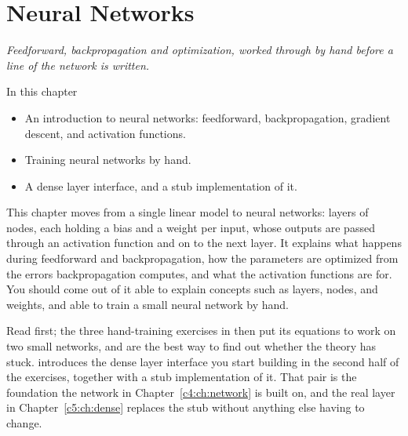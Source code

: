 
\chapter{Neural Networks}
\label{c3:ch:nn}

{\large\itshape Feedforward, backpropagation and optimization, worked through by hand before a
line of the network is written.\par}

\begin{chapterbox}{In this chapter}
\begin{itemize}
  \item An introduction to neural networks: feedforward, backpropagation, gradient descent, and
    activation functions.
  \item Training neural networks by hand.
  \item A dense layer interface, and a stub implementation of it.
\end{itemize}
\end{chapterbox}

This chapter moves from a single linear model to neural networks: layers of nodes, each holding a
bias and a weight per input, whose outputs are passed through an activation function and on to the
next layer. It explains what happens during feedforward and backpropagation, how the parameters are
optimized from the errors backpropagation computes, and what the activation functions are for. You
should come out of it able to explain concepts such as layers, nodes, and weights, and able to train
a small neural network by hand.

Read  first; the three hand-training exercises in  then
put its equations to work on two small networks, and are the best way to find out whether the
theory has stuck.  introduces the dense layer interface you start building in
the second half of the exercises, together with a stub implementation of it. That pair is the
foundation the network in Chapter~\ref{c4:ch:network} is built on, and the real layer in
Chapter~\ref{c5:ch:dense} replaces the stub without anything else having to change.




